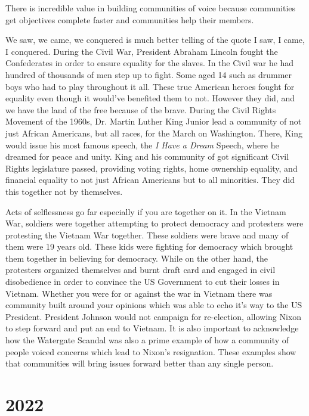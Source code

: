 \documentclass[10pt]{article}
\begin{document}
There is incredible value in building communities of voice because communities get objectives complete faster and communities help their members.

We saw, we came, we conquered is much better telling of the quote I saw, I came, I conquered. During the Civil War, President Abraham Lincoln fought the Confederates in order to ensure equality for the slaves. In the Civil war he had hundred of thousands of men step up to fight. Some aged 14 such as drummer boys who had to play throughout it all. These true American heroes fought for equality even though it would've benefited them to not. However they did, and we have the land of the free because of the brave. During the Civil Rights Movement of the 1960s, Dr. Martin Luther King Junior lead a community of not just African Americans, but all races, for the March on Washington. There, King would issue his most famous speech, the \textit{I Have a Dream} Speech, where he dreamed for peace and unity. King and his community of got significant Civil Rights legislature passed, providing voting rights, home ownership equality, and financial equality to not just African Americans but to all minorities. They did this together not by themselves.

Acts of selflessness go far especially if you are together on it. In the Vietnam War, soldiers were together attempting to protect democracy and protesters were protesting the Vietnam War together. These soldiers were brave and many of them were 19 years old. These kids were fighting for democracy which brought them together in believing for democracy. While on the other hand, the protesters organized themselves and burnt draft card and engaged in civil disobedience in order to convince the US Government to cut their losses in Vietnam. Whether you were for or against the war in Vietnam there was community built around your opinions which was able to echo it's way to the US President. President Johnson would not campaign for re-election, allowing Nixon to step forward and put an end to Vietnam. It is also important to acknowledge how the Watergate Scandal was also a prime example of how a community of people voiced concerns which lead to Nixon's resignation. These examples show that communities will bring issues forward better than any single person.

\section{2022}
\end{document}
